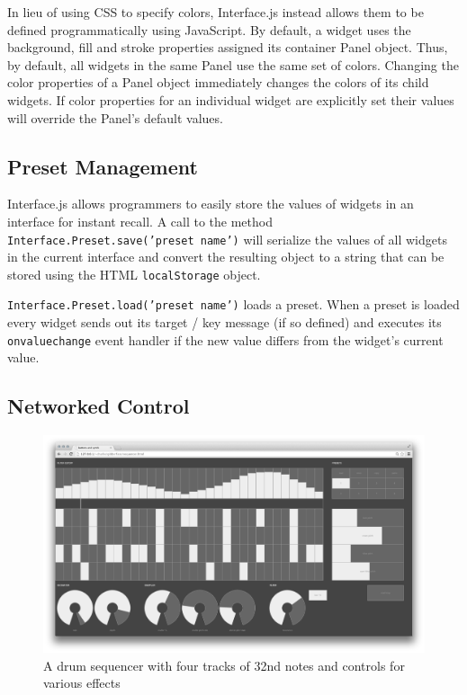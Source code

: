 In lieu of using CSS to specify colors, Interface.js instead allows them to be defined programmatically using JavaScript. By default, a widget uses the background, fill and stroke properties assigned its container Panel object. Thus, by default, all widgets in the same Panel use the same set of colors. Changing the color properties of a Panel object immediately changes the colors of its child widgets. If color properties for an individual widget are explicitly set their values will override the Panel's default values.

\subsection{Preset Management}
Interface.js allows programmers to easily store the values of widgets in an interface for instant recall. A call to the method \texttt{Interface.Preset.save('preset name')} will serialize the values of all widgets in the current interface and convert the resulting object to a string that can be stored using the HTML \texttt{localStorage} object. 

\texttt{Interface.Preset.load('preset name')} loads a preset. When a preset is loaded every widget sends out its target / key message (if so defined) and executes its \texttt{onvaluechange} event handler if the new value differs from the widget's current value.

\subsection{Networked Control}

\begin{figure}[t]
    \centering
		\includegraphics[width=\textwidth]{screenshot}
	\caption{A drum sequencer with four tracks of 32nd notes and controls for various effects}
\label{Roberts:fig:drumsequencer}
\end{figure}

